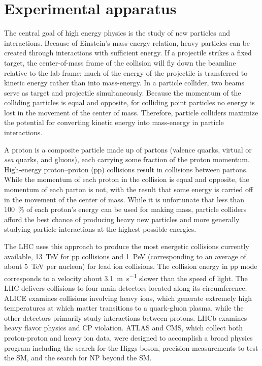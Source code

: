 \chapter{Experimental apparatus}
\label{chap:apparatus}
The central goal of high energy physics is the study of new particles and
interactions. Because of Einstein's mass-energy relation, heavy particles can be
created through interactions with sufficient energy. If a projectile strikes a
fixed target, the center-of-mass frame of the collision will fly down the
beamline relative to the lab frame; much of the energy of the projectile is
transferred to kinetic energy rather than into mass-energy. In a particle
collider, two beams serve as target and projectile simultaneously. Because the
momentum of the colliding particles is equal and opposite, for colliding point
particles no energy is lost in the movement of the center of mass. Therefore,
particle colliders maximize the potential for converting kinetic energy into
mass-energy in particle interactions.

A proton is a composite particle made up of partons (valence quarks, virtual or
\emph{sea} quarks, and gluons), each carrying some fraction of the proton
momentum. High-energy proton--proton (pp) collisions result in collisions
between partons. While the momentum of each proton in the collision is equal and
opposite, the momentum of each parton is not, with the result that some energy
is carried off in the movement of the center of mass. While it is unfortunate
that less than \SI{100}{\percent} of each proton's energy can be used for making
mass, particle colliders afford the best chance of producing heavy new particles
and more generally studying particle interactions at the highest possible
energies.

The LHC uses this approach to produce the most energetic collisions currently
available, \SI{13}{TeV} for pp collisions and \SI{1}{PeV} (corresponding to an
average of about \SI{5}{TeV} per nucleon) for lead ion collisions. The collision
energy in pp mode corresponds to a velocity about \SI{3.1}{\meter\per\second}
slower than the speed of light. The LHC delivers collisions to four main
detectors located along its circumference. ALICE examines collisions involving
heavy ions, which generate extremely high temperatures at which matter
transitions to a quark-gluon plasma, while the other detectors primarily study
interactions between protons. LHCb examines heavy flavor physics and CP
violation. ATLAS and CMS, which collect both proton-proton and heavy ion data,
were designed to accomplish a broad physics program including the search for the
Higgs boson, precision measurements to test the SM, and the search for NP beyond
the SM.

